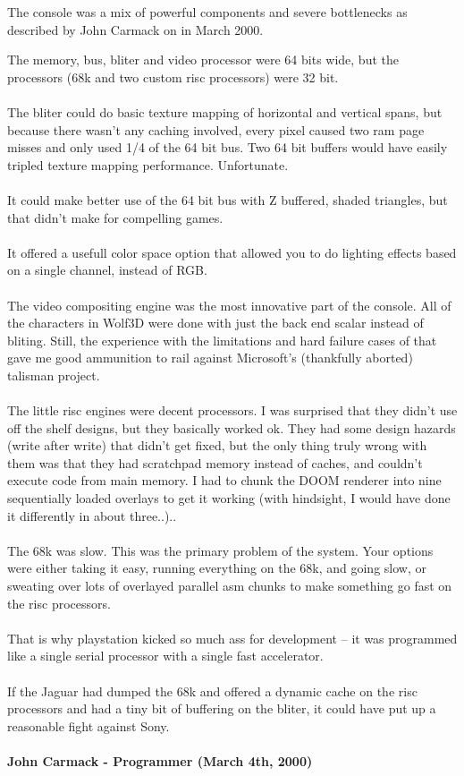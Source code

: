 \documentclass[book.tex]{subfiles}
\begin{document}
The console was a mix of powerful components and severe bottlenecks as described by John Carmack on  in March 2000. 
\par
\begin{fancyquotes}
The memory, bus, bliter and video processor were 64 bits wide, but the processors (68k and two custom risc processors) were 32 bit.\\
\\
The bliter could do basic texture mapping of horizontal and vertical spans, but because there wasn't any caching involved, every pixel caused two ram page misses and only used 1/4 of the 64 bit bus. Two 64 bit buffers would have easily tripled texture mapping performance. Unfortunate.\\
\\
It could make better use of the 64 bit bus with Z buffered, shaded triangles, but that didn't make for compelling games.\\
\\
It offered a usefull color space option that allowed you to do lighting effects based on a single channel, instead of RGB.\\
\\
The video compositing engine was the most innovative part of the console. All of the characters in Wolf3D were done with just the back end scalar instead of bliting. Still, the experience with the limitations and hard failure cases of that gave me good ammunition to rail against Microsoft's (thankfully aborted) talisman project.\\
\\
The little risc engines were decent processors. I was surprised that they didn't use off the shelf designs, but they basically worked ok. They had some design hazards (write after write) that didn't get fixed, but the only thing truly wrong with them was that they had scratchpad memory instead of caches, and couldn't execute code from main memory. I had to chunk the DOOM renderer into nine sequentially loaded overlays to get it working (with hindsight, I would have done it differently in about three..)..\\
\\
The 68k was slow. This was the primary problem of the system. Your options were either taking it easy, running everything on the 68k, and going slow, or sweating over lots of overlayed parallel asm chunks to make something go fast on the risc processors.\\
\\
That is why playstation kicked so much ass for development -- it was programmed like a single serial processor with a single fast accelerator.\\
\\
If the Jaguar had dumped the 68k and offered a dynamic cache on the risc processors and had a tiny bit of buffering on the bliter, it could have put up a reasonable fight against Sony.\\
\\
\textbf{John Carmack - Programmer (March 4th, 2000)}
\end{fancyquotes}
\end{document}
